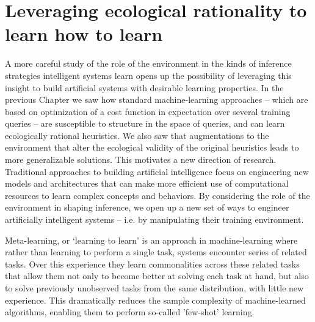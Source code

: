 \chapter{Leveraging ecological rationality to learn how to learn}
\label{chap:causal}

A more careful study of the role of the environment in the kinds of inference strategies intelligent systems learn opens up the possibility of leveraging this insight to build artificial systems with desirable learning properties. In the previous Chapter we saw how standard machine-learning approaches -- which are based on optimization of a cost function in expectation over several training queries -- are susceptible to structure in the space of queries, and can learn ecologically rational heuristics. We also saw that augmentations to the environment that alter the ecological validity of the original heuristics leads to more generalizable solutions. This motivates a new direction of research. Traditional approaches to building artificial intelligence focus on engineering new models and architectures that can make more efficient use of computational resources to learn complex concepts and behaviors. By considering the role of the environment in shaping inference, we open up a new set of ways to engineer artificially intelligent systems -- i.e. by manipulating their training environment.

Meta-learning, or `learning to learn'\cite{schmidhuber1987evolutionary, thrun2012learning} is an approach in machine-learning where rather than learning to perform a single task, systems encounter series of related tasks. Over this experience they learn commonalities across these related tasks that allow them not only to become better at solving each task at hand, but also to solve previously unobserved tasks from the same distribution, with little new experience. This dramatically reduces the sample complexity of machine-learned algorithms, enabling them to perform so-called 'few-shot' learning\citep{vinyals2016matching, ravi2016optimization}. 

